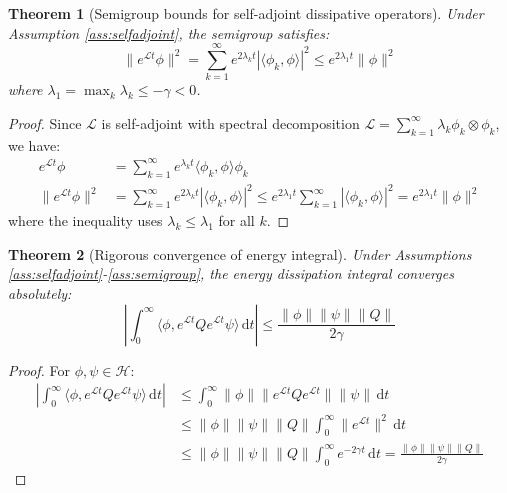 \documentclass[a4paper,12pt]{article}
\newtheorem{theorem}{Theorem}[section]
\newcommand{\dd}{\,\mathrm{d}}
\def\H{\mathcal{H}}
\newcommand{\inner}[2]{\langle #1, #2 \rangle}
\begin{document}
\begin{theorem}[Semigroup bounds for self-adjoint dissipative operators]\label{thm:semigroup_bounds}
Under Assumption \ref{ass:selfadjoint}, the semigroup satisfies:
\begin{equation}
\|e^{\mathcal{L}t}\phi\|^2 = \sum_{k=1}^{\infty} e^{2\lambda_k t} |\inner{\phi_k}{\phi}|^2 \leq e^{2\lambda_1 t}\|\phi\|^2
\end{equation}
where $\lambda_1 = \max_k \lambda_k \leq -\gamma < 0$.
\end{theorem}

\begin{proof}
Since $\mathcal{L}$ is self-adjoint with spectral decomposition $\mathcal{L} = \sum_{k=1}^{\infty} \lambda_k \phi_k \otimes \phi_k$, we have:
\begin{align}
e^{\mathcal{L}t}\phi &= \sum_{k=1}^{\infty} e^{\lambda_k t} \inner{\phi_k}{\phi} \phi_k\\
\|e^{\mathcal{L}t}\phi\|^2 &= \sum_{k=1}^{\infty} e^{2\lambda_k t} |\inner{\phi_k}{\phi}|^2 \leq e^{2\lambda_1 t} \sum_{k=1}^{\infty} |\inner{\phi_k}{\phi}|^2 = e^{2\lambda_1 t}\|\phi\|^2
\end{align}
where the inequality uses $\lambda_k \leq \lambda_1$ for all $k$.
\end{proof}

\begin{theorem}[Rigorous convergence of energy integral]\label{thm:rigorous_convergence}
Under Assumptions \ref{ass:selfadjoint}-\ref{ass:semigroup}, the energy dissipation integral converges absolutely:
\begin{equation}
\left|\int_0^{\infty} \inner{\phi}{e^{\mathcal{L}t} Q e^{\mathcal{L}t} \psi} \dd t\right| \leq \frac{\|\phi\|\|\psi\|\|Q\|}{2\gamma}
\end{equation}
\end{theorem}

\begin{proof}
For $\phi, \psi \in \H$:
\begin{align}
\left|\int_0^{\infty} \inner{\phi}{e^{\mathcal{L}t} Q e^{\mathcal{L}t} \psi} \dd t\right| 
&\leq \int_0^{\infty} \|\phi\| \|e^{\mathcal{L}t} Q e^{\mathcal{L}t}\| \|\psi\| \dd t\\
&\leq \|\phi\|\|\psi\|\|Q\| \int_0^{\infty} \|e^{\mathcal{L}t}\|^2 \dd t\\
&\leq \|\phi\|\|\psi\|\|Q\| \int_0^{\infty} e^{-2\gamma t} \dd t = \frac{\|\phi\|\|\psi\|\|Q\|}{2\gamma}
\end{align}
\end{proof}
\end{document}
